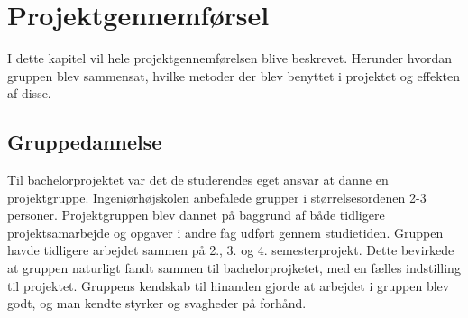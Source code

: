 \chapter{Projektgennemførsel}
I dette kapitel vil hele projektgennemførelsen blive beskrevet. Herunder hvordan
gruppen blev sammensat, hvilke metoder der blev benyttet i projektet og effekten af disse.

\section{Gruppedannelse}
Til bachelorprojektet var det de studerendes eget ansvar at danne en projektgruppe. 
Ingeniørhøjskolen anbefalede grupper i størrelsesordenen 2-3 personer. Projektgruppen
blev dannet på baggrund af både tidligere projektsamarbejde og opgaver i andre fag udført gennem studietiden. 
Gruppen havde tidligere arbejdet sammen på 2., 3. og 4. semesterprojekt.
Dette bevirkede at gruppen naturligt fandt sammen til bachelorprojketet, med en fælles indstilling til projektet.
Gruppens kendskab til hinanden gjorde at arbejdet i gruppen blev godt, og man kendte styrker og svagheder på forhånd. \\